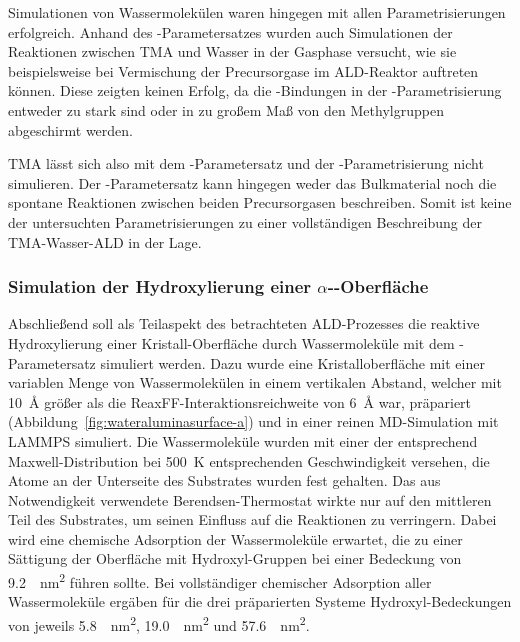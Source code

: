 Simulationen von Wassermolekülen waren hingegen mit allen Parametrisierungen erfolgreich.
Anhand des -Parametersatzes wurden auch Simulationen der Reaktionen zwischen TMA und Wasser in der Gasphase versucht, wie sie beispielsweise bei Vermischung der Precursorgase im ALD-Reaktor auftreten können.
Diese zeigten keinen Erfolg, da die -Bindungen in der -Parametrisierung entweder zu stark sind oder in zu großem Maß von den Methylgruppen abgeschirmt werden.

TMA lässt sich also mit dem -Parametersatz und der -Parametrisierung nicht simulieren.
Der -Parametersatz kann hingegen weder das Bulkmaterial noch die spontane Reaktionen zwischen beiden Precursorgasen beschreiben.
Somit ist keine der untersuchten Parametrisierungen zu einer vollständigen Beschreibung der TMA-Wasser-ALD in der Lage.

\subsubsection{Simulation der Hydroxylierung einer \texorpdfstring{$\alpha$-}{alpha-Al2O3}-Oberfläche}

Abschließend soll als Teilaspekt des betrachteten ALD-Prozesses die reaktive Hydroxylierung einer Kristall-Oberfläche durch Wassermoleküle mit dem -Parametersatz simuliert werden.
Dazu wurde eine Kristalloberfläche mit einer variablen Menge von Wassermolekülen in einem vertikalen Abstand, welcher mit \SI{10}{\angstrom} größer als die ReaxFF-Inter\-aktions\-reich\-weite von \SI{6}{\angstrom} war, präpariert (Abbildung~\ref{fig:wateraluminasurface-a}) und in einer reinen MD-Simulation mit LAMMPS simuliert.
Die Wassermoleküle wurden mit einer der entsprechend Maxwell-Distribution bei \SI{500}{\kelvin} entsprechenden Geschwindigkeit versehen, die Atome an der Unterseite des Substrates wurden fest gehalten.
Das aus Notwendigkeit verwendete Berendsen-Thermostat wirkte nur auf den mittleren Teil des Substrates, um seinen Einfluss auf die Reaktionen zu verringern.
Dabei wird eine chemische Adsorption der Wassermoleküle erwartet\cite{shapovalov_ab_2000}, die zu einer Sättigung der Oberfläche mit Hydroxyl-Gruppen bei einer Bedeckung von \SI{9.2}{\per\square\nano\meter}\cite{kim_energy_2011} führen sollte.
Bei vollständiger chemischer Adsorption aller Wassermoleküle ergäben für die drei präparierten Systeme Hydroxyl-Bedeckungen von jeweils \SI{5.8}{\per\square\nano\meter}, \SI{19.0}{\per\square\nano\meter} und \SI{57.6}{\per\square\nano\meter}.

